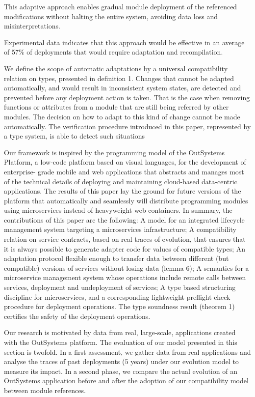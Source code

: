 This adaptive approach enables gradual module deployment of the referenced modifications without halting the entire system, avoiding data loss and misinterpretations.

Experimental data \cite{seco2020robust} indicates that this approach would be effective in an average of 57\% of deployments that would require adaptation and recompilation.

We define the scope of automatic adaptations by a universal compatibility relation
on types, presented in definition 1. Changes that cannot be adapted automatically,
and would result in inconsistent system states, are detected and prevented before any
deployment action is taken. That is the case when removing functions or attributes
from a module that are still being referred by other modules. The decision on how to
adapt to this kind of change cannot be made automatically. The verification procedure
introduced in this paper, represented by a type system, is able to detect such situations

Our framework is inspired by the programming model of the OutSystems Platform,
a low-code platform based on visual languages, for the development of enterprise-
grade mobile and web applications that abstracts and manages most of the technical
details of deploying and maintaining cloud-based data-centric applications. The results
of this paper lay the ground for future versions of the platform that automatically
and seamlessly will distribute programming modules using microservices instead of
heavyweight web containers.
In summary, the contributions of this paper are the following:
A model for an integrated lifecycle management system targeting a microservices
infrastructure;
A compatibility relation on service contracts, based on real traces of evolution, that
ensures that it is always possible to generate adapter code for values of compatible
types;
An adaptation protocol flexible enough to transfer data between different (but
compatible) versions of services without losing data (lemma 6);
A semantics for a microservice management system whose operations include
remote calls between services, deployment and undeployment of services;
A type based structuring discipline for microservices, and a corresponding lightweight
preflight check procedure for deployment operations. The type soundness result
(theorem 1) certifies the safety of the deployment operations.


Our research is motivated by data from real, large-scale, applications created with
the OutSystems platform. The evaluation of our model presented in this section is
twofold. In a first assessment, we gather data from real applications and analyse the
traces of past deployments (5 years) under our evolution model to measure its impact.
In a second phase, we compare the actual evolution of an OutSystems application
before and after the adoption of our compatibility model between module references.

